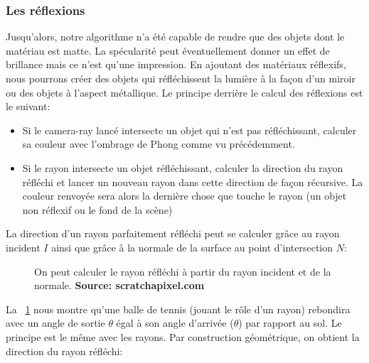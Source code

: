 \documentclass[11pt]{article}
\begin{document}
\subsubsection{Les réflexions}
\label{reflexions}

Jusqu'alors, notre algorithme n'a été capable de rendre que des objets dont le matériau est matte. La spécularité peut éventuellement donner un effet de brillance mais ce n'est qu'une impression. En ajoutant des matériaux réflexifs, nous pourrons créer des objets qui réfléchissent la lumière à la façon d'un miroir ou des objets à l'aspect métallique. Le principe derrière le calcul des réflexions est le suivant:
\begin{itemize}
	\item{Si le camera-ray lancé intersecte un objet qui n'est pas réfléchissant, calculer sa couleur avec l'ombrage de Phong comme vu précédemment.}
	\item{Si le rayon intersecte un objet réfléchissant, calculer la direction du rayon réfléchi et lancer un nouveau rayon dans cette direction de façon récursive. La couleur renvoyée sera alors la dernière chose que touche le rayon (un objet non réflexif ou le fond de la scène)}
\end{itemize}
La direction d'un rayon parfaitement réfléchi peut se calculer grâce au rayon incident $I$ ainsi que grâce à la normale de la surface au point d'intersection $N$:

\begin{figure}[h!]

	\caption{On peut calculer le rayon réfléchi à partir du rayon incident et de la normale. \textbf{Source: scratchapixel.com}}
	\label{reflectionCalcul}
\end{figure}
\FloatBarrier

La \figurename\ \ref{reflectionCalcul} nous montre qu'une balle de tennis (jouant le rôle d'un rayon) rebondira avec un angle de sortie $\theta$ égal à son angle d'arrivée ($\theta$) par rapport au sol. Le principe est le même avec les rayons. Par construction géométrique, on obtient la direction du rayon réfléchi:
\end{document}
